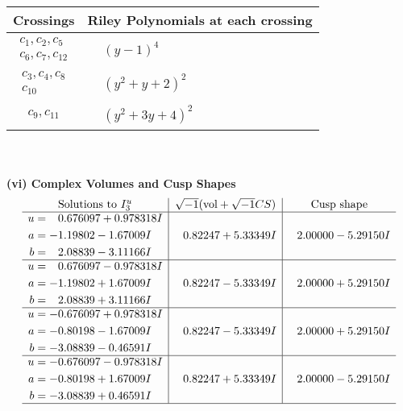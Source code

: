 \documentclass[1p]{elsarticle_modified}
\theoremstyle{definition}
\newcommand{\I}{\sqrt{-1}}
\begin{document}
\begin{tabular}{m{50pt}|m{274pt}}
Crossings & \hspace{64pt}Riley Polynomials at each crossing \\
\hline $$\begin{aligned}c_{1},c_{2},c_{5}\\c_{6},c_{7},c_{12}\end{aligned}$$&$\begin{aligned}
&(y-1)^4
\end{aligned}$\\
\hline $$\begin{aligned}c_{3},c_{4},c_{8}\\c_{10}\end{aligned}$$&$\begin{aligned}
&(y^2+y+2)^2
\end{aligned}$\\
\hline $$\begin{aligned}c_{9},c_{11}\end{aligned}$$&$\begin{aligned}
&(y^2+3 y+4)^2
\end{aligned}$\\
\hline
\end{tabular}\\~\\
\newpage\flushleft \textbf{(vi) Complex Volumes and Cusp Shapes}
$$\begin{array}{c|c|c}  
\text{Solutions to }I^u_{3}& \I (\text{vol} + \sqrt{-1}CS) & \text{Cusp shape}\\
 \hline 
\begin{aligned}
u &= \phantom{-}0.676097 + 0.978318 I \\
a &= -1.19802 - 1.67009 I \\
b &= \phantom{-}2.08839 - 3.11166 I\end{aligned}
 & \phantom{-}0.82247 + 5.33349 I & \phantom{-}2.00000 - 5.29150 I \\ \hline\begin{aligned}
u &= \phantom{-}0.676097 - 0.978318 I \\
a &= -1.19802 + 1.67009 I \\
b &= \phantom{-}2.08839 + 3.11166 I\end{aligned}
 & \phantom{-}0.82247 - 5.33349 I & \phantom{-}2.00000 + 5.29150 I \\ \hline\begin{aligned}
u &= -0.676097 + 0.978318 I \\
a &= -0.80198 - 1.67009 I \\
b &= -3.08839 - 0.46591 I\end{aligned}
 & \phantom{-}0.82247 - 5.33349 I & \phantom{-}2.00000 + 5.29150 I \\ \hline\begin{aligned}
u &= -0.676097 - 0.978318 I \\
a &= -0.80198 + 1.67009 I \\
b &= -3.08839 + 0.46591 I\end{aligned}
 & \phantom{-}0.82247 + 5.33349 I & \phantom{-}2.00000 - 5.29150 I\\
 \hline 
 \end{array}$$\newpage\newpage\renewcommand{\arraystretch}{1}
\end{document}
